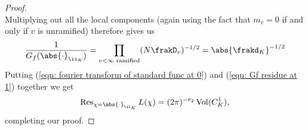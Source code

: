 \documentclass[11pt, x11names, openany]{book}
\begin{document}
\begin{proof}
\begin{equation*}
\end{equation*}
Multiplying out all the local components (again using the fact that $m_v = 0$ if and only if $v$ is unramified) therefore gives us
\begin{equation}
    \label{eqn: Gf residue at 1}
    \frac{1}{G_f(\abs{\cdot}_{\ii_K})} = \prod_{v < \infty \text{ ramified}} (N\frakD_v)^{-1/2} = \abs{\frakd_K}^{-1/2} 
\end{equation}
Putting  (\ref{eqn: fourier transform of standard func at 0}) and (\ref{eqn: Gf residue at 1})  together we get
\begin{equation*}
     \res_{\chi = \abs{\cdot}_{\ii_K}} L(\chi) =  (2 \pi)^{- r_2} \vol(C^1_K),
\end{equation*}
completing our proof.
\end{proof}
\end{document}
